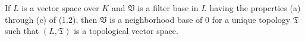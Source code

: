 If $L$ is a vector space over $K$ and $\mathfrak{V}$ is a filter base in $L$ having the properties (a) through (c) of (1.2), then $\mathfrak{V}$ is a neighborhood base of $0$ for a unique topology $\mathfrak{T}$ such that $(L, \mathfrak{T})$ is a topological vector space.
